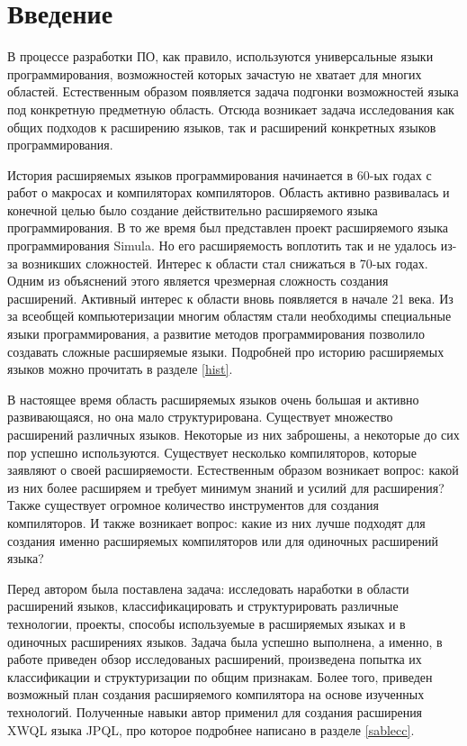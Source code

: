 \documentclass[a4paper,12pt,titlepage]{extarticle}
\begin{document}
\section{Введение}

В процессе разработки ПО, как правило, используются универсальные языки
программирования, возможностей которых зачастую не хватает для многих областей.
Естественным образом появляется задача подгонки возможностей языка под
конкретную предметную область. Отсюда возникает задача исследования как общих
подходов к расширению языков, так и расширений конкретных языков
программирования.

История расширяемых языков программирования начинается в 60-ых годах с работ о
макросах и компиляторах компиляторов. Область активно развивалась и конечной
целью было создание действительно расширяемого языка программирования. В
то же время был представлен проект расширяемого языка программирования Simula.
Но его расширяемость воплотить так и не удалось из-за возникших сложностей.
Интерес к области стал снижаться в 70-ых годах. Одним из объяснений
этого является чрезмерная сложность создания расширений. Активный интерес к
области вновь появляется в начале 21 века. Из за всеобщей компьютеризации
многим областям стали необходимы специальные языки программирования, а развитие
методов программирования позволило создавать сложные расширяемые языки.
Подробней про историю расширяемых языков можно прочитать в разделе \ref{hist}.

В настоящее время область расширяемых языков очень большая и активно
развивающаяся, но она мало структурирована. Существует множество расширений
различных языков. Некоторые из них заброшены, а некоторые до сих пор успешно
используются. Существует несколько компиляторов, которые заявляют о своей
расширяемости. Естественным образом возникает вопрос: какой из них более
расширяем и требует минимум знаний и усилий для расширения? Также существует
огромное количество инструментов для создания компиляторов. И также возникает
вопрос: какие из них лучше подходят для создания именно расширяемых
компиляторов или для одиночных расширений языка? 

Перед автором была поставлена задача: исследовать наработки в области
расширений языков, классификацировать и структурировать различные технологии,
проекты, способы используемые в расширяемых языках и в одиночных расширениях
языков. Задача была успешно выполнена, а именно, в работе приведен обзор
исследованых расширений, произведена попытка их классификации и структуризации
по общим признакам. Более того, приведен возможный план создания расширяемого
компилятора на основе изученных технологий. Полученные навыки автор применил
для создания расширения XWQL языка JPQL, про которое подробнее написано в
разделе \ref{sablecc}.
\end{document}
